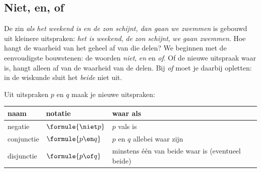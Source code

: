 \begin{oefeningen}
\end{oefeningen}

\subsection{Niet, en, of}

De zin \textit{als het weekend is en de zon schijnt, dan gaan we zwemmen} is gebouwd uit kleinere uitspraken: \textit{het is weekend}, \textit{de zon schijnt}, \textit{we gaan zwemmen}. Hoe hangt de waarheid van het geheel af van die delen? We beginnen met de eenvoudigste bouwstenen: de woorden \textit{niet}, \textit{en} en \textit{of}. Of de nieuwe uitspraak waar is, hangt alleen af van de waarheid van de delen. Bij \textit{of} moet je daarbij opletten: in de wiskunde sluit het \textit{beide} niet uit.

\begin{theorie}
Uit uitspraken $p$ en $q$ maak je nieuwe uitspraken:

\vspace{1mm}
{\centering{}\renewcommand{\arraystretch}{1.45}%
\begin{tabular}{|>{\centering\arraybackslash}m{2.4cm}|>{\centering\arraybackslash}m{2cm}|>{\centering\arraybackslash}m{8.6cm}|}
\hline
\textbf{naam} & \textbf{notatie} & \textbf{waar als} \\ \hline
negatie & $\formule{\niet p}$ & $p$ vals is \\ \hline
conjunctie & $\formule{p \en q}$ & $p$ en $q$ allebei waar zijn \\ \hline
disjunctie & $\formule{p \of q}$ & minstens één van beide waar is (eventueel beide) \\ \hline
\end{tabular}\par}
\end{theorie}


